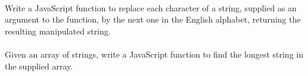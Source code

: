 \documentclass[10pt, a4paper, twosize]{article}
\begin{document}
\paragraph{} Write a JavaScript function to replace each character of a string, supplied as an argument to the function, by the next one in the English alphabet, returning the resulting manipulated string.


\paragraph{} Given an array of strings, write a JavaScript function to find the longest string in the supplied array.



\end{document}
